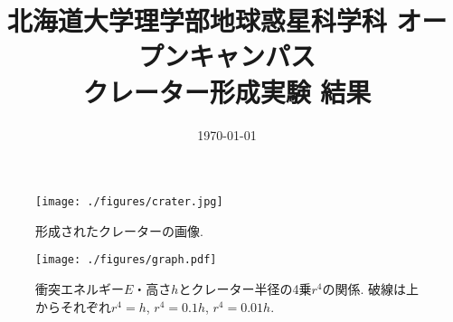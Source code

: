 \documentclass[a4paper]{ltjsarticle}
\begin{document}
\title{北海道大学理学部地球惑星科学科 オープンキャンパス\\クレーター形成実験 結果}
\date{\today}
\maketitle
\thispagestyle{empty}
\begin{figure}[H]
    \centering
    \texttt{[image: ./figures/crater.jpg]}
    \caption{形成されたクレーターの画像.}
\end{figure}
\begin{figure}[H]
    \centering
    \texttt{[image: ./figures/graph.pdf]}
    \caption{衝突エネルギー$E$・高さ$h$とクレーター半径の4乗$r^4$の関係. 破線は上からそれぞれ$r^4=h$, $r^4=0.1h$, $r^4=0.01h$.}
\end{figure}
\end{document}
